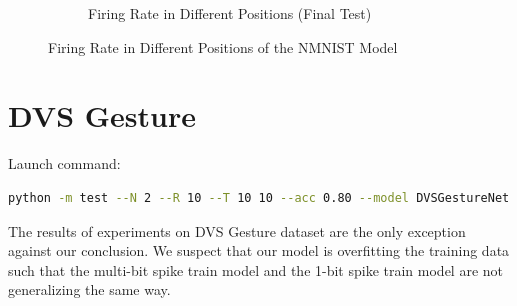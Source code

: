 \begin{figure}[H]
\begin{subfigure}[H]{\textwidth}
                \caption{Firing Rate in Different Positions (Final Test)}
            \end{subfigure}
            \caption{Firing Rate in Different Positions of the NMNIST Model}
        \end{figure}

    \section{DVS Gesture}
    \label{appendix:firerate_dvs_gesture}
        Launch command: 
        \begin{lstlisting}[language=Bash, basicstyle=\small, breaklines=true]
python -m test --N 2 --R 10 --T 10 10 --acc 0.80 --model DVSGestureNet --data-path /scratch/zyi/codeSpace/data --dataset DVSGesture --batch-size 128 --opt adam --lr 1e-3 --lr-scheduler cosa --epochs 200 --lr-warmup-epochs 0 --output-dir /scratch/zyi/codeSpace/MultibitSpikes/firerate
        \end{lstlisting}

        The results of experiments on DVS Gesture dataset are the only exception against our conclusion. We suspect that our model is overfitting the training data such that the multi-bit spike train model and the 1-bit spike train model are not generalizing the same way. 

